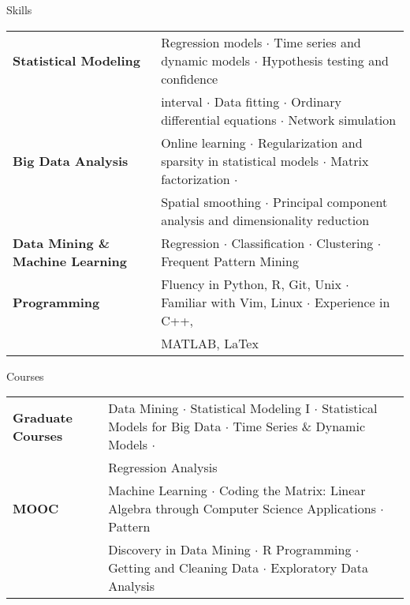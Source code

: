 \documentclass{my_resume} %
\begin{document}
\begin{rSection}{Skills}

\begin{tabular}{ @{} >{\bfseries}l @{\hspace{6ex}} l }
  Statistical Modeling & Regression models {$\cdot$} Time series and
  dynamic models {$\cdot$} Hypothesis testing and confidence \\
  & interval {$\cdot$} Data fitting {$\cdot$} Ordinary differential
  equations {$\cdot$} Network simulation\\
  Big Data Analysis & Online learning {$\cdot$} Regularization and sparsity in
  statistical models {$\cdot$} Matrix factorization {$\cdot$}\\
  & Spatial smoothing {$\cdot$} Principal component analysis and
  dimensionality reduction\\
  Data Mining \& Machine Learning & Regression {$\cdot$} Classification
  {$\cdot$} Clustering {$\cdot$} Frequent Pattern Mining\\
  Programming & Fluency in Python, R, Git, Unix {$\cdot$} Familiar with Vim,
  Linux {$\cdot$} Experience in C++,\\
  & MATLAB, LaTex\\
\end{tabular}
\end{rSection}


\begin{rSection}{Courses}

\begin{tabular}{ @{} >{\bfseries}l @{\hspace{6ex}} l }
  Graduate Courses & Data Mining {$\cdot$} Statistical Modeling I
  {$\cdot$} Statistical Models for Big Data {$\cdot$} Time Series \&
  Dynamic Models {$\cdot$} \\
  & Regression Analysis\\
  MOOC & Machine Learning {$\cdot$} Coding the Matrix: Linear Algebra through Computer
  Science Applications {$\cdot$} Pattern \\
  & Discovery in Data Mining {$\cdot$} R Programming {$\cdot$}
  Getting and Cleaning Data {$\cdot$} Exploratory Data Analysis\\
\end{tabular}
\end{rSection}
\end{document}
